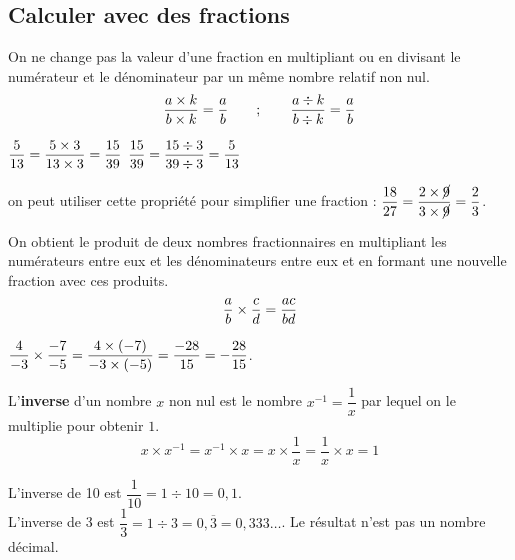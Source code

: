 \subsection{Calculer avec des fractions} %

\begin{propriete}
   On ne change pas la valeur d'une fraction en multipliant ou en divisant le numérateur et le dénominateur par un même nombre relatif non nul.
   $${a\times k\over b\times k}={a\over b} \qquad ; \qquad {a\div k\over b\div k}={a\over b}$$
\end{propriete}

\begin{exemple*1}   
   $\displaystyle{{5\over13}={5\times3\over13\times3}={15\over39}}$ \hskip2cm $\displaystyle{{15\over39}={15\div3\over39\div3}={5\over13}}$
\end{exemple*1}
\begin{remarque}
   on peut utiliser cette propriété pour simplifier une fraction : $\displaystyle{{18\over27}={2\times\cancel9\over3\times\cancel9}={2\over3}}$.
\end{remarque}


\begin{propriete}[Produit]
   On obtient le produit de deux nombres fractionnaires en multipliant les numérateurs entre eux et les dénominateurs entre eux et en formant une nouvelle fraction avec ces produits.
   $${a\over b}\times{c\over d}={ac\over bd}$$
\end{propriete}

\begin{exemple*1}
   $\displaystyle{{4\over-3}\times{-7\over -5} ={4\times(-7)\over-3\times(-5)} ={-28\over15} =-{28\over15}}$.
\end{exemple*1}


\begin{definition}[Inverse]
   L'\textbf{inverse} d'un nombre $x$ non nul est le nombre $x^{-1} =\dfrac1x$ par lequel on le multiplie pour obtenir $1$.
   $$x\times x^{-1} =x^{-1}\times x =x\times\dfrac1x =\dfrac1x\times x =1$$
\end{definition}

\begin{exemple*1}
   L'inverse de 10 est $\dfrac{1}{10} =1\div10 =0,1$. \\
   L'inverse de 3 est $\dfrac13 =1\div3=0,\overline{3} =0,333\dots$. Le résultat n'est pas un nombre décimal.
\end{exemple*1}


